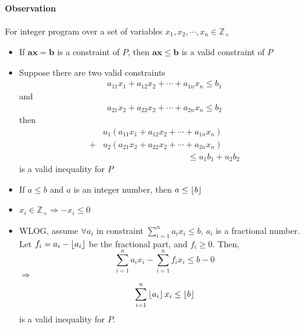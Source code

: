                 \paragraph{Observation}
                    For integer program over a set of variables $x_1, x_2, \cdots, x_n \in \mathbb{Z}_+$
                    \begin{itemize}
                        \item If $\mathbf{ax} = \mathbf{b}$ is a constraint of $P$, then $\mathbf{ax \le b}$ is a valid constraint of $P$
                        \item Suppose there are two valid constraints
                            \begin{align*}
                                a_{11} x_1 + a_{12} x_2 + \cdots + a_{1n} x_n \le b_1
                            \end{align*}
                            and
                            \begin{align*}
                                a_{21} x_2 + a_{22} x_2 + \cdots + a_{2n} x_n \le b_2
                            \end{align*}
                            then
                            \begin{align*}
                                & u_1 (a_{11} x_1 + a_{12} x_2 + \cdots + a_{1n} x_n)\\
                              + & u_2 (a_{21} x_2 + a_{22} x_2 + \cdots + a_{2n} x_n) \\
                                & \qquad \qquad \qquad \qquad \qquad \le u_1 b_1 + u_2 b_2
                            \end{align*}
                            is a valid inequality for $P$
                        \item If $a \le b$ and $a$ is an integer number, then $a \le \left\lfloor b \right\rfloor$
                        \item $x_i \in \mathbb{Z}_+ \Rightarrow -x_i \le 0$
                        \item WLOG, assume $\forall a_i$ in constraint $\sum_{i=1}^n a_i x_i \le b$, $a_i$ is a fractional number. Let $f_i = a_i - \left\lfloor a_i \right\rfloor$ be the fractional part, and $f_i \ge 0$. Then,
                        \begin{equation*}
                            \sum_{i=1}^n a_i x_i - \sum_{i=1}^n f_i x_i \le b - 0
                        \end{equation*}
                        $\Rightarrow$
                        \begin{equation*}
                            \sum_{i=1}^n \left\lfloor a_i \right\rfloor x_i \le \left\lfloor b \right\rfloor
                        \end{equation*} is a valid inequality for $P$.
                    \end{itemize}
                    
